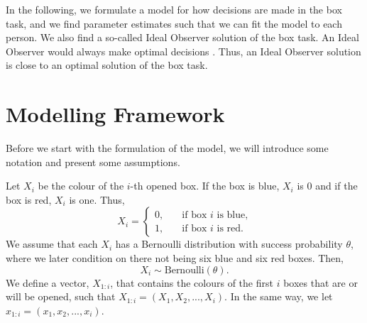 In the following, we formulate a model for how decisions are made in the box task, and we find parameter estimates such that we can fit the model to each person. We also find a so-called Ideal Observer solution of the box task. An Ideal Observer would always make optimal decisions \citep{idealObs}. Thus, an Ideal Observer solution is close to an optimal solution of the box task. 



\section{Modelling Framework}
\label{section_notation}
Before we start with the formulation of the model, we will introduce some notation and present some assumptions. 

Let $X_i$ be the colour of the $i$-th opened box. If the box is blue, $X_i$ is 0 and if the box is red, $X_i$ is one. Thus,
\begin{equation*}
    X_i = \begin{cases}
    0,& \quad \text{if box } i \text{ is blue,}\\
    1,& \quad \text{if box } i \text{ is red.}
    \end{cases}
\end{equation*}
We assume that each $X_i$ has a Bernoulli distribution with success probability $\theta$, where we later condition on there not being six blue and six red boxes. Then,
\begin{equation*}
    X_i \sim \text{Bernoulli}(\theta).
\end{equation*}
We define a vector, $X_{1:i}$, that contains the colours of the first $i$ boxes that are or will be opened, such that $X_{1:i} = (X_1,X_2,...,X_{i})$. In the same way, we let $x_{1:i} = (x_1,x_2,...,x_{i})$.

